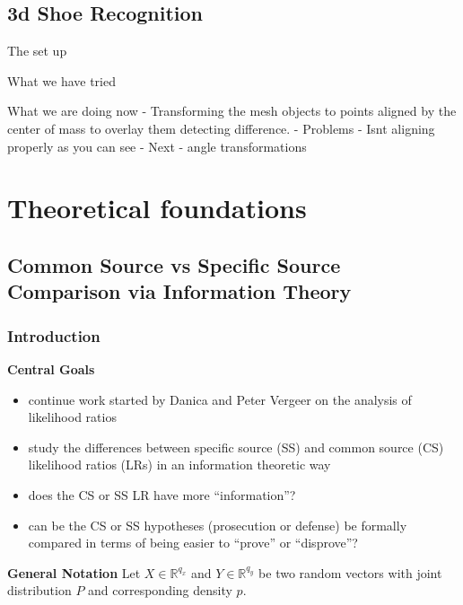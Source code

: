 \documentclass[]{book}
\providecommand{\tightlist}{%
  \setlength{\itemsep}{0pt}\setlength{\parskip}{0pt}}
\begin{document}
\hypertarget{d-shoe-recognition}{%
\section{3d Shoe Recognition}\label{d-shoe-recognition}}

The set up

What we have tried

What we are doing now
- Transforming the mesh objects to points aligned by the center of mass to overlay them detecting difference.
- Problems
- Isnt aligning properly as you can see
- Next
- angle transformations

\hypertarget{theoretical-foundations}{%
\chapter{Theoretical foundations}\label{theoretical-foundations}}

\hypertarget{common-source-vs-specific-source-comparison-via-information-theory}{%
\section{Common Source vs Specific Source Comparison via Information Theory}\label{common-source-vs-specific-source-comparison-via-information-theory}}

\hypertarget{introduction}{%
\subsection{Introduction}\label{introduction}}

\textbf{Central Goals}

\begin{itemize}
\tightlist
\item
  continue work started by Danica and Peter Vergeer on the analysis of likelihood ratios
\item
  study the differences between specific source (SS) and common source (CS) likelihood ratios (LRs) in an information theoretic way
\item
  does the CS or SS LR have more ``information''?
\item
  can be the CS or SS hypotheses (prosecution or defense) be formally compared in terms of being easier to ``prove'' or ``disprove''?
\end{itemize}

\textbf{General Notation}
Let \(X \in \mathbb{R}^{q_x}\) and \(Y \in \mathbb{R}^{q_y}\) be two random vectors with joint distribution \(P\) and corresponding density \(p\).
\end{document}
